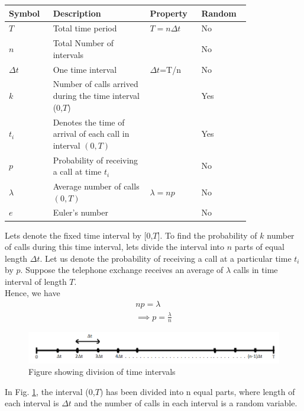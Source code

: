 


\begin{table}[h!]
\centering
    \begin{tabular}{|p{0.14\linewidth}|p{0.35\linewidth}|p{0.16\linewidth}|p{0.16\linewidth}|}
    \hline
    \textbf{Symbol} & \textbf{Description} & \textbf{Property} & \textbf{Random}\\[0.5ex]
    \hline
    $T$ & Total time period & $T=n\Delta t$ &No\\
    \hline
    $n$ & Total Number of intervals &  &No\\
    \hline
    $\Delta t$ & One time interval & $\Delta t$=T/n & No\\
    \hline
    $k$ & Number of calls arrived during the time interval (0,$T$) & & Yes\\
    \hline
    $t_i$ & Denotes the time of arrival of each call in interval $(0,T)$ & &Yes\\
    \hline
    $p$ & Probability of receiving a call at time $t_i$ & &No\\
    \hline
    $\lambda$ & Average number of calls $(0,T)$ & $\lambda=np$ &No\\
    \hline
    $e$ & Euler's number & &No\\
    \hline
    \end{tabular}
\end{table}
Lets denote the fixed time interval by [0,$T$].
To find the probability of $k$ number of calls during this time interval, lets divide the interval into $n$ parts of equal length $\Delta t$.
Let us denote the probability of receiving a call at a particular time $t_i$ by $p$. Suppose the telephone exchange receives an average of $\lambda$ calls in time interval of length $T$.\\
Hence, we have
\begin{align}
    np=\lambda\\
    \implies p=\frac{\lambda}{n}
\end{align}
\begin{figure}[ht]
    \centering
    \includegraphics[width=\columnwidth]{solutions/ec/43/Figures/figure1.png}
    \caption{Figure showing division of time intervals}
    \label{ec43:figure_1}
\end{figure}
In Fig. \ref{ec43:figure_1}, the interval (0,$T$) has been divided into n equal parts, where length of each interval is $\Delta t$ and the number of calls in each interval is a random variable.
